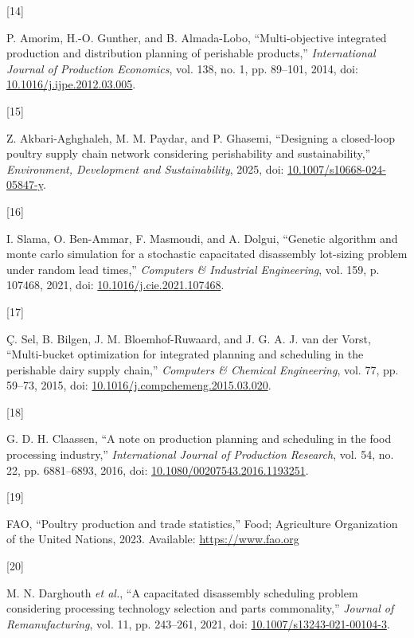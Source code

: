 \documentclass[
  spanish,
  12pt,
]{article}
\newlength{\cslhangindent}
\newlength{\csllabelwidth}
\newenvironment{CSLReferences}[2] %
 {\begin{list}{}{%
  \setlength{\itemindent}{0pt}
  \setlength{\leftmargin}{0pt}
  \setlength{\parsep}{0pt}
  \ifodd #1
   \setlength{\leftmargin}{\cslhangindent}
   \setlength{\itemindent}{-1\cslhangindent}
  \fi
  \setlength{\itemsep}{#2\baselineskip}}}
 {\end{list}}
\newcommand{\CSLLeftMargin}[1]{\parbox[t]{\csllabelwidth}{\strut#1\strut}}
\newcommand{\CSLRightInline}[1]{\parbox[t]{\linewidth - \csllabelwidth}{\strut#1\strut}}
\begin{document}
\begin{CSLReferences}{0}{0}
\CSLLeftMargin{{[}14{]} }%
\CSLRightInline{P. Amorim, H.-O. Gunther, and B. Almada-Lobo,
{``Multi-objective integrated production and distribution planning of
perishable products,''} \emph{International Journal of Production
Economics}, vol. 138, no. 1, pp. 89--101, 2014, doi:
\href{https://doi.org/10.1016/j.ijpe.2012.03.005}{10.1016/j.ijpe.2012.03.005}.}

\CSLLeftMargin{{[}15{]} }%
\CSLRightInline{Z. Akbari-Aghghaleh, M. M. Paydar, and P. Ghasemi,
{``Designing a closed-loop poultry supply chain network considering
perishability and sustainability,''} \emph{Environment, Development and
Sustainability}, 2025, doi:
\href{https://doi.org/10.1007/s10668-024-05847-y}{10.1007/s10668-024-05847-y}.}

\CSLLeftMargin{{[}16{]} }%
\CSLRightInline{I. Slama, O. Ben-Ammar, F. Masmoudi, and A. Dolgui,
{``Genetic algorithm and monte carlo simulation for a stochastic
capacitated disassembly lot-sizing problem under random lead times,''}
\emph{Computers \& Industrial Engineering}, vol. 159, p. 107468, 2021,
doi:
\href{https://doi.org/10.1016/j.cie.2021.107468}{10.1016/j.cie.2021.107468}.}

\CSLLeftMargin{{[}17{]} }%
\CSLRightInline{Ç. Sel, B. Bilgen, J. M. Bloemhof-Ruwaard, and J. G. A.
J. van der Vorst, {``Multi-bucket optimization for integrated planning
and scheduling in the perishable dairy supply chain,''} \emph{Computers
\& Chemical Engineering}, vol. 77, pp. 59--73, 2015, doi:
\href{https://doi.org/10.1016/j.compchemeng.2015.03.020}{10.1016/j.compchemeng.2015.03.020}.}

\CSLLeftMargin{{[}18{]} }%
\CSLRightInline{G. D. H. Claassen, {``A note on production planning and
scheduling in the food processing industry,''} \emph{International
Journal of Production Research}, vol. 54, no. 22, pp. 6881--6893, 2016,
doi:
\href{https://doi.org/10.1080/00207543.2016.1193251}{10.1080/00207543.2016.1193251}.}

\CSLLeftMargin{{[}19{]} }%
\CSLRightInline{FAO, {``Poultry production and trade statistics,''}
Food; Agriculture Organization of the United Nations, 2023. Available:
\url{https://www.fao.org}}

\CSLLeftMargin{{[}20{]} }%
\CSLRightInline{M. N. Darghouth \emph{et al.}, {``A capacitated
disassembly scheduling problem considering processing technology
selection and parts commonality,''} \emph{Journal of Remanufacturing},
vol. 11, pp. 243--261, 2021, doi:
\href{https://doi.org/10.1007/s13243-021-00104-3}{10.1007/s13243-021-00104-3}.}


\end{CSLReferences}
\end{document}
